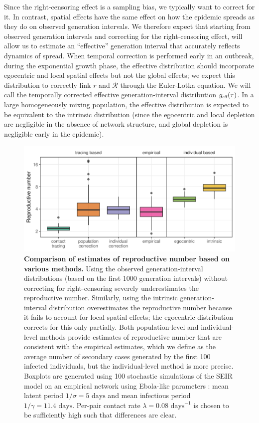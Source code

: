 \documentclass[12pt]{article}
\newcommand{\RR}{\ensuremath{{\mathcal R}}}
\newcommand{\tsub}[2]{#1_{{\textrm{\tiny #2}}}}
\begin{document}
Since the right-censoring effect is a sampling bias, we typically want to correct for it. 
In contrast, spatial effects have the same effect on how the epidemic spreads as they do on observed generation intervals. 
We therefore expect that starting from observed generation intervals and correcting for the right-censoring effect, will allow us to estimate an ``effective'' generation interval that accurately reflects dynamics of spread. 
When temporal correction is performed early in an outbreak, during the exponential growth phase, the effective distribution should incorporate egocentric and local spatial effects but not the global effects; we expect this distribution to correctly link $r$ and $\RR$ through the Euler-Lotka equation. 
We will call the temporally corrected effective generation-interval distribution $\tsub{g}{eff}(\tau)$.
In a large homogeneously mixing population, the effective distribution is expected to be equivalent to the intrinsic distribution (since the egocentric and local depletion are negligible in the absence of network structure, and global depletion is negligible early in the epidemic).

\begin{figure}[!pbth]
\includegraphics[width=\textwidth]{../fig/cmp_reproductive.pdf}
\caption{\textbf{Comparison of estimates of reproductive number based on various methods.}
Using the observed generation-interval distributions (based on the first 1000 generation intervals) without correcting for right-censoring severely underestimates the reproductive number.
Similarly, using the intrinsic generation-interval distribution overestimates the reproductive number because it fails to account for local spatial effects; the egocentric distribution corrects for this only partially.
Both population-level and individual-level methods provide estimates of reproductive number that are consistent with the empirical estimates, which we define as the average number of secondary cases generated by the first 100 infected individuals, but the individual-level method is more precise.
Boxplots are generated using 100 stochastic simulations of the SEIR model on an empirical network using Ebola-like parameters \citep{who2014ebola}: mean latent period $1/\sigma = 5 \textrm{ days}$ and mean infectious period $1/\gamma = 11.4 \textrm{ days}$. 
Per-pair contact rate $\lambda = 0.08 \textrm{ days}^{-1}$ is chosen to be sufficiently high such that differences are clear.
}
\label{fig:cmp}
\end{figure}
\end{document}
